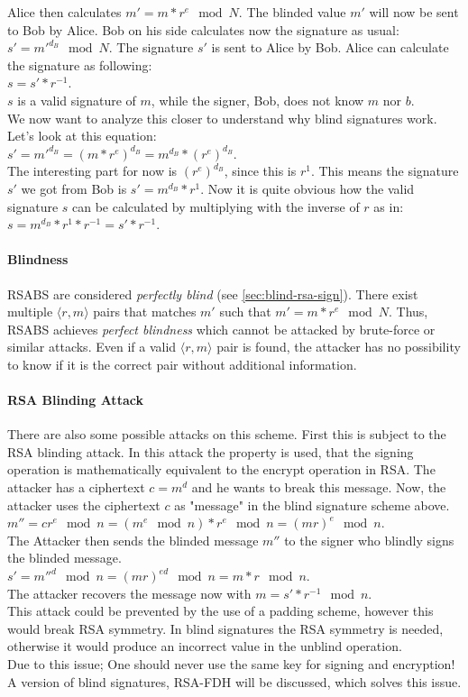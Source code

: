 Alice then calculates $m'=m*r^e \mod N$. The blinded value $m'$ will now be sent to Bob by Alice.
Bob on his side calculates now the signature as usual: $s' = m'^{d_B} \mod N$.
The signature $s' $ is sent to Alice by Bob. Alice can calculate the signature as following: \\$s = s' * r^{-1}$.
\\$s$ is a valid signature of $m$, while the signer, Bob, does not know $m$ nor $b$.
\\We now want to analyze this closer to understand why blind signatures work.
Let's look at this equation:
\\$ s' = m'^{d_B} = (m*r^e)^{d_B} = m^{d_B} * (r^e)^{d_B}$.
\\The interesting part for now is $(r^e)^{d_B}$, since this is $r^1$.
This means the signature $s'$ we got from Bob is $s' = m^{d_B} * r^1$.
Now it is quite obvious how the valid signature $s$ can be calculated by multiplying with the inverse of $r$ as in: $ s =  m^{d_B} * r^1 * r^{-1} = s' * r^{-1}$.

\paragraph{Blindness}
\label{par:prop-blindness-rsa}
\gls{RSABS} are considered \textit{perfectly blind} (see \autoref{sec:blind-rsa-sign}).
There exist multiple $\langle r, m \rangle$ pairs that matches $m'$ such that $m' = m * r^e \mod N$.
Thus, \gls{RSABS} achieves \textit{perfect blindness} which cannot be attacked by brute-force or similar attacks.
Even if a valid $\langle r, m \rangle$ pair is found, the attacker has no possibility to know if it is the correct pair without additional information.

\paragraph{RSA Blinding Attack}
There are also some possible attacks on this scheme.
First this is subject to the RSA blinding attack.
In this attack the property is used, that the signing operation is mathematically equivalent to the encrypt operation in RSA.
The attacker has a ciphertext $c = m^d$ and he wants to break this message.
Now, the attacker uses the ciphertext $c$ as "message" in the blind signature scheme above.
\\$m'' = cr^e \mod n = (m^e \mod n) * r^e \mod n = (mr)^e \mod n$.
    \\The Attacker then sends the blinded message $m''$ to the signer who blindly signs the blinded message.
    \\$s' = m''^d \mod n = (mr)^{ed} \mod n = m*r \mod n$.
\\The attacker recovers the message now with $m = s'*r^{-1} \mod n$.
\\This attack could be prevented by the use of a padding scheme, however this would break RSA symmetry.
In blind signatures the RSA symmetry is needed, otherwise it would produce an incorrect value in the unblind operation.
\\Due to this issue; One should never use the same key for signing and encryption!
A version of blind signatures, RSA-FDH will be discussed, which solves this issue. \cite{enwiki:blind-sign}

